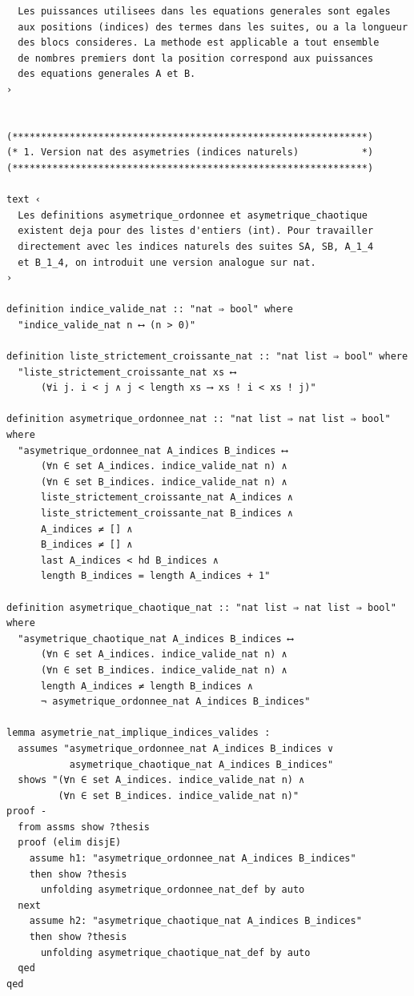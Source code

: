 \documentclass[a4paper,11pt]{article}
\begin{document}
\begin{holcode}[title={\textcolor{white}{Fichier : methode\_spectral.thy -- Partie 1/4}}]
\begin{lstlisting}
  Les puissances utilisees dans les equations generales sont egales
  aux positions (indices) des termes dans les suites, ou a la longueur
  des blocs consideres. La methode est applicable a tout ensemble
  de nombres premiers dont la position correspond aux puissances
  des equations generales A et B.
›


(**************************************************************)
(* 1. Version nat des asymetries (indices naturels)           *)
(**************************************************************)

text ‹
  Les definitions asymetrique_ordonnee et asymetrique_chaotique
  existent deja pour des listes d'entiers (int). Pour travailler
  directement avec les indices naturels des suites SA, SB, A_1_4
  et B_1_4, on introduit une version analogue sur nat.
›

definition indice_valide_nat :: "nat ⇒ bool" where
  "indice_valide_nat n ⟷ (n > 0)"

definition liste_strictement_croissante_nat :: "nat list ⇒ bool" where
  "liste_strictement_croissante_nat xs ⟷
      (∀i j. i < j ∧ j < length xs ⟶ xs ! i < xs ! j)"

definition asymetrique_ordonnee_nat :: "nat list ⇒ nat list ⇒ bool" where
  "asymetrique_ordonnee_nat A_indices B_indices ⟷
      (∀n ∈ set A_indices. indice_valide_nat n) ∧
      (∀n ∈ set B_indices. indice_valide_nat n) ∧
      liste_strictement_croissante_nat A_indices ∧
      liste_strictement_croissante_nat B_indices ∧
      A_indices ≠ [] ∧
      B_indices ≠ [] ∧
      last A_indices < hd B_indices ∧
      length B_indices = length A_indices + 1"

definition asymetrique_chaotique_nat :: "nat list ⇒ nat list ⇒ bool" where
  "asymetrique_chaotique_nat A_indices B_indices ⟷
      (∀n ∈ set A_indices. indice_valide_nat n) ∧
      (∀n ∈ set B_indices. indice_valide_nat n) ∧
      length A_indices ≠ length B_indices ∧
      ¬ asymetrique_ordonnee_nat A_indices B_indices"

lemma asymetrie_nat_implique_indices_valides :
  assumes "asymetrique_ordonnee_nat A_indices B_indices ∨
           asymetrique_chaotique_nat A_indices B_indices"
  shows "(∀n ∈ set A_indices. indice_valide_nat n) ∧
         (∀n ∈ set B_indices. indice_valide_nat n)"
proof -
  from assms show ?thesis
  proof (elim disjE)
    assume h1: "asymetrique_ordonnee_nat A_indices B_indices"
    then show ?thesis
      unfolding asymetrique_ordonnee_nat_def by auto
  next
    assume h2: "asymetrique_chaotique_nat A_indices B_indices"
    then show ?thesis
      unfolding asymetrique_chaotique_nat_def by auto
  qed
qed



\end{lstlisting}
\end{holcode}
\end{document}
